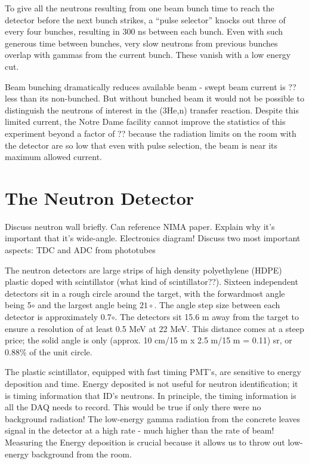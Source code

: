 
To give all the neutrons resulting from one beam bunch time to reach the detector before the next bunch strikes, a ``pulse selector'' knocks out three of every four bunches, resulting in 300 ns between each bunch.  Even with such generous time between bunches, very slow neutrons from previous bunches overlap with gammas from the current bunch.  These vanish with a low energy cut.


Beam bunching dramatically reduces available beam - swept beam current is ?? less than its non-bunched.  But without bunched beam it would not be possible to distinguish the neutrons of interest in the (3He,n) transfer reaction.  Despite this limited current, the Notre Dame facility cannot improve the statistics of this experiment beyond a factor of ?? because the radiation limits on the room with the detector are so low that even with pulse selection, the beam is near its maximum allowed current.


\section{The Neutron Detector}
Discuss neutron wall briefly.  Can reference NIMA paper. Explain why it's important that it's wide-angle. 
Electronics diagram!  Discuss two most important aspects: TDC and ADC from phototubes

The neutron detectors are large strips of high density polyethylene (HDPE) plastic doped with scintillator (what kind of scintillator??).  Sixteen independent detectors sit in a rough circle around the target, with the forwardmost angle being 5$\circ$ and the largest angle being $21\circ$.  The angle step size between each detector is approximately 0.7$\circ$.  The detectors sit 15.6 m away from the target to ensure a resolution of at least 0.5 MeV at 22 MeV.  This distance comes at a steep price; the solid angle is only (approx. 10 cm/15 m x 2.5 m/15 m = 0.11) sr, or 0.88\% of the unit circle.


The plastic scintillator, equipped with fast timing PMT's, are sensitive to energy deposition and time.  Energy deposited is not useful for neutron identification; it is timing information that ID's neutrons.  In principle, the timing information is all the DAQ needs to record.  This would be true if only there were no background radiation!  The low-energy gamma radiation from the concrete leaves signal in the detector at a high rate - much higher than the rate of beam! Measuring the Energy deposition is crucial because it allows us to throw out low-energy background from the room.  

